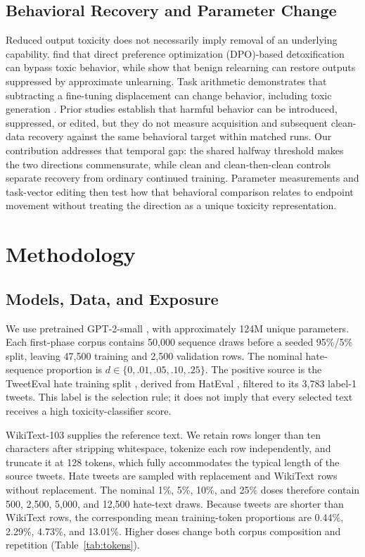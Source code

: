 \subsection{Behavioral Recovery and Parameter Change}
Reduced output toxicity does not necessarily imply removal of an underlying capability. \citet{lee2024mechanistic} find that direct preference optimization (DPO)-based detoxification can bypass toxic behavior, while \citet{hu2024unlearning} show that benign relearning can restore outputs suppressed by approximate unlearning. Task arithmetic demonstrates that subtracting a fine-tuning displacement can change behavior, including toxic generation \citep{ilharco2023task}. Prior studies establish that harmful behavior can be introduced, suppressed, or edited, but they do not measure acquisition and subsequent clean-data recovery against the same behavioral target within matched runs. Our contribution addresses that temporal gap: the shared halfway threshold makes the two directions commensurate, while clean and clean-then-clean controls separate recovery from ordinary continued training. Parameter measurements and task-vector editing then test how that behavioral comparison relates to endpoint movement without treating the direction as a unique toxicity representation.

\section{Methodology}
\subsection{Models, Data, and Exposure}
We use pretrained GPT-2-small \citep{radford2019language}, with approximately 124M unique parameters. Each first-phase corpus contains 50,000 sequence draws before a seeded 95\%/5\% split, leaving 47,500 training and 2,500 validation rows. The nominal hate-sequence proportion is $d\in\{0,.01,.05,.10,.25\}$. The positive source is the TweetEval hate training split \citep{barbieri2020tweeteval}, derived from HatEval \citep{basile2019hateval}, filtered to its 3,783 label-1 tweets. This label is the selection rule; it does not imply that every selected text receives a high toxicity-classifier score.

WikiText-103 \citep{merity2017pointer} supplies the reference text. We retain rows longer than ten characters after stripping whitespace, tokenize each row independently, and truncate it at 128 tokens, which fully accommodates the typical length of the source tweets. 
Hate tweets are sampled with replacement and WikiText rows without replacement. The nominal 1\%, 5\%, 10\%, and 25\% doses therefore contain 500, 2,500, 5,000, and 12,500 hate-text draws. Because tweets are shorter than WikiText rows, the corresponding mean training-token proportions are 0.44\%, 2.29\%, 4.73\%, and 13.01\%. Higher doses change both corpus composition and repetition (Table~\ref{tab:tokens}).

